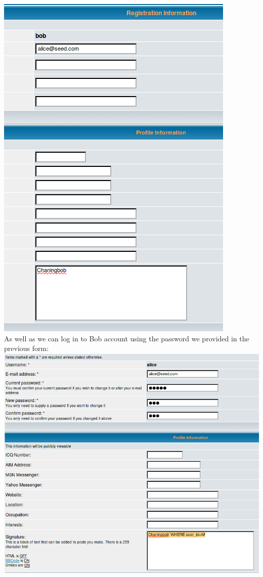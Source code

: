 \documentclass[12pt, a4paper, pdflatex]{article}
\begin{document}
\includegraphics[width=.95\textwidth]{gfx/sql/changed_bob.png}\\
As well as we can log in to Bob account using the password we provided in the previous form:\\
\includegraphics[width=.95\textwidth]{gfx/sql/chainging_alice.png}\\
\end{document}
